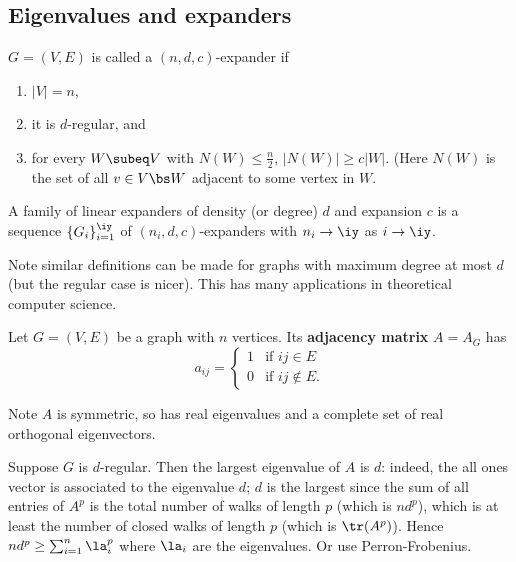 
\subsection{Eigenvalues and expanders}
\begin{df}
$G=(V,E)$ is called a $(n,d,c)$-expander if
\begin{enumerate}
\item $|V|=n$,
\item it is $d$-regular, and
\item for every $W\subeq V$ with $N(W)\le \frac n2$, $|N(W)|\ge c|W|$. (Here $N(W)$ is the set of all $v\in V\bs W$ adjacent to some vertex in $W$.
\end{enumerate}
\end{df}
\begin{df}
A family of linear expanders of density (or degree) $d$ and expansion $c$ is a sequence $\{G_i\}_{i=1}^{\iy}$ of $(n_i,d,c)$-expanders with $n_i\to \iy$ as $i\to \iy$.
\end{df}
Note similar definitions can be made for graphs with maximum degree at most $d$ (but the regular case is nicer). 
This has many applications in theoretical computer science. 

\begin{df}
Let $G=(V,E)$ be a graph with $n$ vertices. Its \textbf{adjacency matrix} $A=A_G$ has
\[
a_{ij}=\begin{cases}
1&\text{if }ij\in E\\
0&\text{if }ij\nin E.
\end{cases}
\]
\end{df}
Note $A$ is symmetric, so has real eigenvalues and a complete set of real orthogonal eigenvectors.

Suppose $G$ is $d$-regular. Then the largest eigenvalue of $A$ is $d$: indeed, the all ones vector is associated to the eigenvalue $d$; $d$ is the largest since the sum of all entries of $A^p$ is the total number of walks of length $p$ (which is $nd^p$), which is at least the number of closed walks of length $p$ (which is $\tr(A^p)$). Hence $nd^p\ge \sum_{i=1}^n\la_i^p$ where $\la_i$ are the eigenvalues. 
Or use Perron-Frobenius.  

